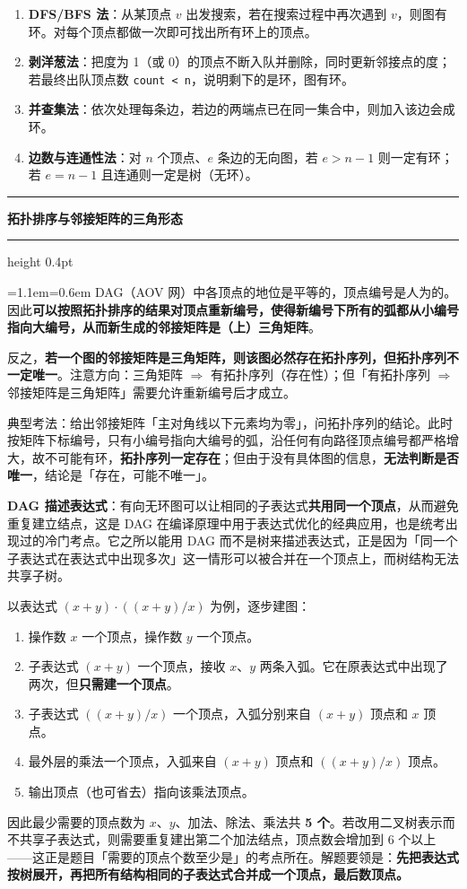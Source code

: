 \documentclass[11pt,openany,UTF8]{ctexbook}
\newcommand{\callouthead}[2]{%
  \par\addvspace{7pt}\noindent
  {\color{#1}\rule[-0.15em]{3pt}{1.05em}}\hspace{0.5em}%
  {\bfseries\color{#1}#2}\par\nobreak\vspace{-0.35em}%
  {\color{rulesep}\hrule height 0.4pt}\nobreak\vspace{0.45em}%
  \begingroup\small\setlength{\parindent}{0pt}%
  \leftskip=1.1em\rightskip=0.6em\noindent\ignorespaces}
\newcommand{\calloutend}{\par\endgroup\addvspace{7pt}}
\newenvironment{callkey}[1]{\callouthead{keybar}{#1}}{\calloutend}
\begin{document}
\begin{enumerate}
\item \textbf{DFS/BFS 法}：从某顶点 $v$ 出发搜索，若在搜索过程中再次遇到 $v$，则图有环。对每个顶点都做一次即可找出所有环上的顶点。
\item \textbf{剥洋葱法}：把度为 1（或 0）的顶点不断入队并删除，同时更新邻接点的度；若最终出队顶点数 \texttt{count <\allowbreak{} n}，说明剩下的是环，图有环。
\item \textbf{并查集法}：依次处理每条边，若边的两端点已在同一集合中，则加入该边会成环。
\item \textbf{边数与连通性法}：对 $n$ 个顶点、$e$ 条边的无向图，若 $e>n-1$ 则一定有环；若 $e=n-1$ 且连通则一定是树（无环）。
\end{enumerate}
\begin{callkey}{拓扑排序与邻接矩阵的三角形态}
DAG（AOV 网）中各顶点的地位是平等的，顶点编号是人为的。因此\textbf{可以按照拓扑排序的结果对顶点重新编号，使得新编号下所有的弧都从小编号指向大编号，从而新生成的邻接矩阵是（上）三角矩阵}。

反之，\textbf{若一个图的邻接矩阵是三角矩阵，则该图必然存在拓扑序列，但拓扑序列不一定唯一}。注意方向：三角矩阵 $\Rightarrow$ 有拓扑序列（存在性）；但「有拓扑序列 $\Rightarrow$ 邻接矩阵是三角矩阵」需要允许重新编号后才成立。

典型考法：给出邻接矩阵「主对角线以下元素均为零」，问拓扑序列的结论。此时按矩阵下标编号，只有小编号指向大编号的弧，沿任何有向路径顶点编号都严格增大，故不可能有环，\textbf{拓扑序列一定存在}；但由于没有具体图的信息，\textbf{无法判断是否唯一}，结论是「存在，可能不唯一」。

\end{callkey}

\textbf{DAG 描述表达式}：有向无环图可以让相同的子表达式\textbf{共用同一个顶点}，从而避免重复建立结点，这是 DAG 在编译原理中用于表达式优化的经典应用，也是统考出现过的冷门考点。它之所以能用 DAG 而不是树来描述表达式，正是因为「同一个子表达式在表达式中出现多次」这一情形可以被合并在一个顶点上，而树结构无法共享子树。

以表达式 $(x+y)\cdot((x+y)/x)$ 为例，逐步建图：

\begin{enumerate}
\item 操作数 $x$ 一个顶点，操作数 $y$ 一个顶点。
\item 子表达式 $(x+y)$ 一个顶点，接收 $x$、$y$ 两条入弧。它在原表达式中出现了两次，但\textbf{只需建一个顶点}。
\item 子表达式 $((x+y)/x)$ 一个顶点，入弧分别来自 $(x+y)$ 顶点和 $x$ 顶点。
\item 最外层的乘法一个顶点，入弧来自 $(x+y)$ 顶点和 $((x+y)/x)$ 顶点。
\item 输出顶点（也可省去）指向该乘法顶点。
\end{enumerate}
因此最少需要的顶点数为 $x$、$y$、加法、除法、乘法共 \textbf{5 个}。若改用二叉树表示而不共享子表达式，则需要重复建出第二个加法结点，顶点数会增加到 6 个以上——这正是题目「需要的顶点个数至少是」的考点所在。解题要领是：\textbf{先把表达式按树展开，再把所有结构相同的子表达式合并成一个顶点，最后数顶点。}
\end{document}
